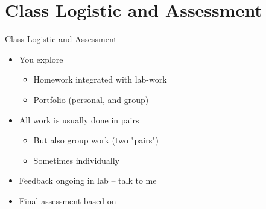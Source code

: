 ﻿\section{Class Logistic and Assessment}

\begin{frame}{Class Logistic and Assessment}
\begin{itemize}
\item \alert{You explore}
\begin{itemize}
\item Homework integrated with lab-work
\item Portfolio (personal, and group)
\end{itemize}
\item All work is usually done in pairs
\begin{itemize}
\item But also \alert{group work} (two "pairs")
\item Sometimes \alert{individually}
\end{itemize}
\item Feedback ongoing in lab -- talk to me
\item \alert{Final assessment} based on
\end{itemize}
\end{frame}

